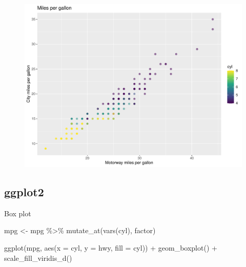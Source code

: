 \documentclass[
  letterpaper,
  DIV=11,
  numbers=noendperiod,
  landscape]{scrartcl}
\newenvironment{Shaded}{\begin{snugshade}}{\end{snugshade}}
\newcommand{\AttributeTok}[1]{\textcolor[rgb]{0.40,0.45,0.13}{#1}}
\newcommand{\FunctionTok}[1]{\textcolor[rgb]{0.28,0.35,0.67}{#1}}
\newcommand{\NormalTok}[1]{\textcolor[rgb]{0.00,0.23,0.31}{#1}}
\newcommand{\OtherTok}[1]{\textcolor[rgb]{0.00,0.23,0.31}{#1}}
\newcommand{\SpecialCharTok}[1]{\textcolor[rgb]{0.37,0.37,0.37}{#1}}
\begin{document}
\begin{figure}[H]

{\centering \includegraphics{RandRStudio_files/figure-pdf/unnamed-chunk-16-1.pdf}

}

\end{figure}

\hypertarget{ggplot2-6}{%
\subsection{ggplot2}\label{ggplot2-6}}

Box plot

\begin{Shaded}
\begin{Highlighting}[]
\NormalTok{mpg }\OtherTok{\textless{}{-}}\NormalTok{ mpg }\SpecialCharTok{\%\textgreater{}\%} \FunctionTok{mutate\_at}\NormalTok{(}\FunctionTok{vars}\NormalTok{(cyl), factor)}

\FunctionTok{ggplot}\NormalTok{(mpg, }\FunctionTok{aes}\NormalTok{(}\AttributeTok{x =}\NormalTok{ cyl, }\AttributeTok{y =}\NormalTok{ hwy, }\AttributeTok{fill =}\NormalTok{ cyl)) }\SpecialCharTok{+}
  \FunctionTok{geom\_boxplot}\NormalTok{() }\SpecialCharTok{+}
  \FunctionTok{scale\_fill\_viridis\_d}\NormalTok{()}
\end{Highlighting}
\end{Shaded}
\end{document}
